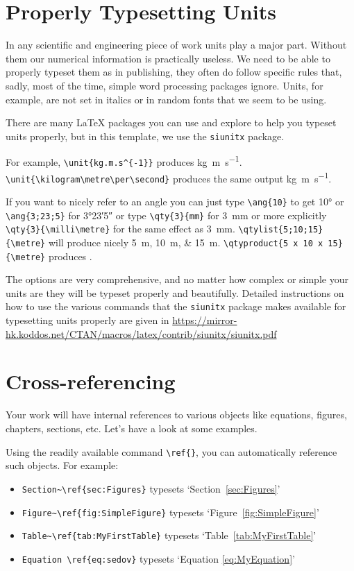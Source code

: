 \section{Properly Typesetting Units}

In any scientific and engineering piece of work units play a major part. Without them our numerical information is practically useless. We need to be able to properly typeset them as in publishing, they often do follow specific rules that, sadly, most of the time, simple word processing packages ignore. Units, for example, are not set in italics or in random fonts that we seem to be using.

There are many \LaTeX{} packages you can use and explore to help you typeset units properly, but in this template, we use the \verb|siunitx| package. 

For example, \verb|\unit{kg.m.s^{-1}}| produces \unit{kg.m.s^{-1}}. \\
\verb|\unit{\kilogram\metre\per\second}| produces the same output \unit{\kilogram\metre\per\second}.

If you want to nicely refer to an angle you can just type \verb|\ang{10}| to get \ang{10} or \verb|\ang{3;23;5}| for \ang{3;23;5} or type \verb|\qty{3}{mm}| for \qty{3}{mm} or more explicitly \verb|\qty{3}{\milli\metre}| for the same effect as \qty{3}{\milli\metre}. 
\verb|\qtylist{5;10;15}{\metre}| will produce nicely \qtylist{5;10;15}{\metre}. 
\verb|\qtyproduct{5 x 10 x 15}{\metre}| produces .


The options are very comprehensive, and no matter how complex or simple your units are they will be typeset properly and beautifully.
Detailed instructions on how to use the various commands that the \verb|siunitx| package makes available for typesetting units properly are given in \url{https://mirror-hk.koddos.net/CTAN/macros/latex/contrib/siunitx/siunitx.pdf}



\section{Cross-referencing}
\label{sec:crossreferencing}

Your work will have internal references to various objects like equations, figures, chapters, sections, etc. Let's have a look at some examples.

Using the readily available command \verb|\ref{}|, you can automatically reference such objects. For example:
\begin{itemize}
    \item \verb|Section~\ref{sec:Figures}| typesets `Section~\ref{sec:Figures}'
    \item \verb|Figure~\ref{fig:SimpleFigure}| typesets `Figure~\ref{fig:SimpleFigure}'
    \item \verb|Table~\ref{tab:MyFirstTable}| typesets `Table~\ref{tab:MyFirstTable}'
    \item \verb|Equation \ref{eq:sedov}| typesets `Equation \ref{eq:MyEquation}'
\end{itemize}

